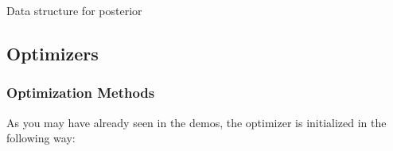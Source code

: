 \documentclass[letterpaper,10pt,english]{sphinxmanual}
\begin{document}

\begin{fulllineitems}
\label{Likelihoods:pyGPs.Core.inf.postStruct}
Data structure for posterior

\end{fulllineitems}



\subsection{Optimizers}
\label{Opts::doc}\label{Opts:optimizers}

\subsubsection{Optimization Methods}
\label{Opts:optimization-methods}
As you may have already seen in the demos, the optimizer is initialized in the following way:
\end{document}
